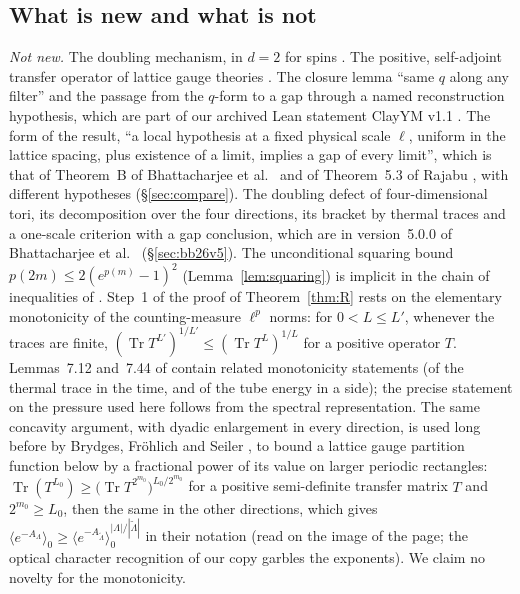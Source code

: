 \documentclass[11pt,a4paper]{article}
\theoremstyle{plain}
\theoremstyle{definition}
\theoremstyle{remark}
\numberwithin{equation}{section}
\newcommand{\Tr}{\operatorname{Tr}}
\begin{document}
\subsection{What is new and what is not}\label{subsec:notnew}
\emph{Not new.} The doubling mechanism, in $d=2$ for spins \cite{OAI26}. The positive, self-adjoint transfer operator of lattice gauge
theories \cite{Lus77,OS78}. The closure lemma ``same $q$ along any filter'' and the passage from the $q$-form to a gap through a named
reconstruction hypothesis, which are part of our archived Lean statement ClayYM v1.1 \cite{ClayYM}. The form of the result, ``a local
hypothesis at a fixed physical scale $\ell$, uniform in the lattice spacing, plus existence of a limit, implies a gap of every limit'',
which is that of Theorem~B of Bhattacharjee et al.\ \cite{BB26} and of Theorem~5.3 of Rajabu \cite{Raj26}, with different hypotheses
(\S\ref{sec:compare}). The doubling defect of four-dimensional tori, its decomposition over the four directions, its bracket by thermal
traces and a one-scale criterion with a gap conclusion, which are in version~5.0.0 of Bhattacharjee et al.\ \cite{BB26v5}
(\S\ref{sec:bb26v5}). The unconditional squaring bound $p(2m)\le2(e^{p(m)}-1)^2$ (Lemma~\ref{lem:squaring}) is implicit in the chain of
inequalities of \cite[proof of Lemma~2.1]{OAI26}. Step~1 of the proof of Theorem~\ref{thm:R} rests on the elementary monotonicity of the counting-measure $\ell^p$ norms: for $0<L\le L'$, whenever the traces are finite, $(\Tr T^{L'})^{1/L'}\le(\Tr T^{L})^{1/L}$ for a positive operator $T$. Lemmas~7.12 and~7.44 of \cite{BB26v5} contain related monotonicity statements (of the thermal trace in the time, and of the tube energy in a side); the precise statement on the pressure used here follows from the spectral representation. The same concavity argument, with dyadic enlargement in every direction, is used long before by Brydges, Fr\"ohlich and Seiler \cite[proof of (2), p.~38 of the preprint]{BFS79}, to bound a lattice gauge partition function below by a fractional power of its value on larger periodic rectangles: $\Tr(T^{L_0})\ge\bigl(\Tr T^{2^{m_0}}\bigr)^{L_0/2^{m_0}}$ for a positive semi-definite transfer matrix $T$ and $2^{m_0}\ge L_0$, then the same in the other directions, which gives $\langle e^{-A_\Lambda}\rangle_0\ge\langle e^{-A_{\widetilde\Lambda}}\rangle_0^{|\Lambda|/|\widetilde\Lambda|}$ in their notation (read on the image of the page; the optical character recognition of our copy garbles the exponents). We claim no novelty for the monotonicity.
\end{document}
